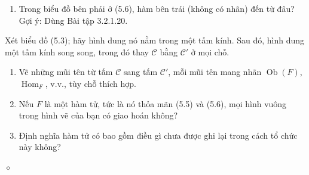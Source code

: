 \begin{enumerate}[label=\alph*.]
\item Trong biểu đồ bên phải ở (5.6), hàm bên trái (không có nhãn) đến từ đâu? Gợi ý: Dùng Bài tập 3.2.1.20.
\end{enumerate}
Xét biểu đồ (5.3); hãy hình dung nó nằm trong một tấm kính. Sau đó, hình dung một tấm kính song song, trong đó thay $\mathcal C$ bằng $\mathcal C'$ ở mọi chỗ.
\begin{enumerate}[label=\alph*.,resume]
\item Vẽ những mũi tên từ tấm $\mathcal C$ sang tấm $\mathcal C'$, mỗi mũi tên mang nhãn $\operatorname{Ob}(F)$, $\operatorname{Hom}_F$, v.v., tùy chỗ thích hợp.
\item Nếu $F$ là một hàm tử, tức là nó thỏa mãn (5.5) và (5.6), mọi hình vuông trong hình vẽ của bạn có giao hoán không?
\item Định nghĩa hàm tử có bao gồm điều gì chưa được ghi lại trong cách tổ chức này không?
\end{enumerate}\hfill$\diamond$
